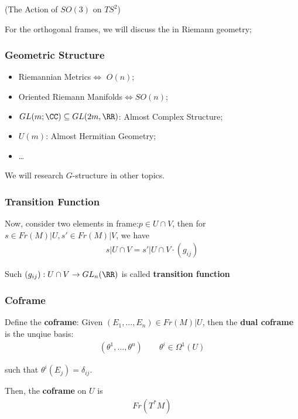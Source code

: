 \documentclass[Total.tex]{subfiles}
\begin{document}
			\begin{example}
				(The Action of $SO(3)$ on $TS^2$)
			\end{example}
			
			For the orthogonal frames, we will discuss the in Riemann geometry;
			
			\subsubsection{Geometric Structure}
			
			\begin{itemize}
				\item Riemannian Metrics$\Leftrightarrow$ $O(n)$;
				\item Oriented Riemann Manifolds$\Leftrightarrow SO(n)$;
				\item $GL(m;\CC)\subseteq GL(2m,\RR)$: Almost Complex Structure;
				\item $U(m)$: Almost Hermitian Geometry;
				\item \dots
			\end{itemize}
			
			We will research $G$-structure in other topics.
			
			\subsubsection{Transition Function}
			\begin{Def}
				Now, consider two elements in frame:$p\in U\cap V$, then for $s\in Fr(M)|U,s'\in Fr(M)|V$, we have
				\begin{gather*}
					s|U\cap V=s'|U\cap V\cdot (g_{ij})
				\end{gather*}
				
				Such $(g_{ij}):U\cap V\rightarrow GL_n(\RR)$ is called \textbf{transition function}
			\end{Def}
			
			\subsubsection{Coframe}
			\begin{Def}
				Define the \textbf{coframe}: Given $(E_1,\dots,E_n)\in Fr(M)|U$, then the \textbf{dual coframe} is the unqiue basis:
				\begin{gather*}
					(\theta^1,\dots,\theta^n)\qquad \theta^i\in \Omega^1(U)
				\end{gather*}
				
				such that $\theta^i(E_j)=\delta_{ij}$. 
				
				Then, the \textbf{coframe} on $U$ is
				\begin{gather*}
					Fr(T^*M)
				\end{gather*}
			\end{Def}
\end{document}
